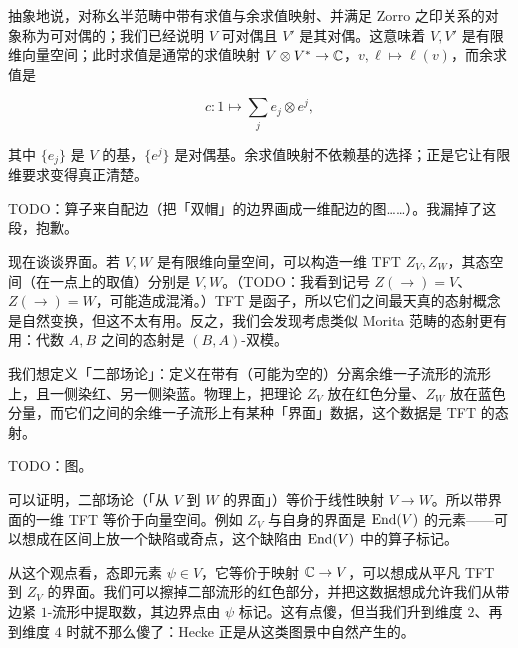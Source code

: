 抽象地说，对称幺半范畴中带有求值与余求值映射、并满足 Zorro 之印关系的对象称为可对偶的；我们已经说明 $V$ 可对偶且 $V'$ 是其对偶。这意味着 $V,V'$ 是有限维向量空间；此时求值是通常的求值映射 $V\otimes V^*\to\mathbb{C}$，$v,\ell\mapsto \ell(v)$，而余求值是

\[c:1\longmapsto \sum_j e_j\otimes e^j,\]

其中 $\{e_j\}$ 是 $V$ 的基，$\{e^j\}$ 是对偶基。余求值映射不依赖基的选择；正是它让有限维要求变得真正清楚。

TODO：算子来自配边（把「双帽」的边界画成一维配边的图……）。我漏掉了这段，抱歉。

现在谈谈界面。若 $V,W$ 是有限维向量空间，可以构造一维 TFT $Z_V,Z_W$，其态空间（在一点上的取值）分别是 $V,W$。（TODO：我看到记号 $Z(\to)=V$、$Z(\to)=W$，可能造成混淆。）TFT 是函子，所以它们之间最天真的态射概念是自然变换，但这不太有用。反之，我们会发现考虑类似 Morita 范畴的态射更有用：代数 $A,B$ 之间的态射是 $(B,A)$-双模。

我们想定义「二部场论」：定义在带有（可能为空的）分离余维一子流形的流形上，且一侧染红、另一侧染蓝。物理上，把理论 $Z_V$ 放在红色分量、$Z_W$ 放在蓝色分量，而它们之间的余维一子流形上有某种「界面」数据，这个数据是 TFT 的态射。

TODO：图。

可以证明，二部场论（「从 $V$ 到 $W$ 的界面」）等价于线性映射 $V\to W$。所以带界面的一维 TFT 等价于向量空间。例如 $Z_V$ 与自身的界面是 $\operatorname{End}(V)$ 的元素——可以想成在区间上放一个缺陷或奇点，这个缺陷由 $\operatorname{End}(V)$ 中的算子标记。

从这个观点看，态即元素 $\psi\in V$，它等价于映射 $\mathbb{C}\to V$，可以想成从平凡 TFT 到 $Z_V$ 的界面。我们可以擦掉二部流形的红色部分，并把这数据想成允许我们从带边紧 $1$-流形中提取数，其边界点由 $\psi$ 标记。这有点傻，但当我们升到维度 $2$、再到维度 $4$ 时就不那么傻了：Hecke 正是从这类图景中自然产生的。
